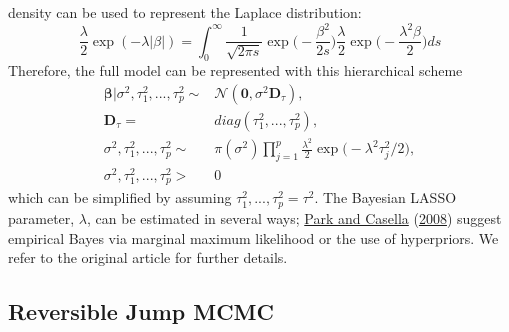 \documentclass[
  12pt,
]{book}
\theoremstyle{break}
\theoremstyle{nonumberplain}
\begin{document}
density can be used to represent the Laplace distribution: \[
\frac{\lambda}{2}\exp(-\lambda|\beta|)=\int_0^\infty \frac{1}{\sqrt{2\pi s}}\exp\bigg(-\frac{\beta^2}{2s}\bigg)\frac{\lambda}{2}\exp\bigg(-\frac{\lambda^2\beta}{2}\bigg)ds
\] Therefore, the full model can be represented with this hierarchical
scheme \begin{align*}
\boldsymbol{\beta}|\sigma^{2},\tau^{2}_{1},...,\tau^{2}_{p}\sim & \mathcal{N}(\boldsymbol{0},\sigma^{2}\boldsymbol{D}_{\tau}), \\
\boldsymbol{D}_{\tau}= & diag(\tau_{1}^{2},...,\tau_{p}^{2}),\\
\sigma^{2},\tau^{2}_{1},...,\tau^{2}_{p}\sim &  \pi(\sigma^{2})\prod_{j=1}^{p}\frac{\lambda^{2}}{2}\exp\bigg(-\lambda^{2}\tau^{2}_{j}/2\bigg),\\
\sigma^{2},\tau^{2}_{1},...,\tau^{2}_{p}> & 0
\end{align*} which can be simplified by assuming
\(\tau^{2}_{1},...,\tau^{2}_{p}=\tau^{2}\). The Bayesian LASSO
parameter, \(\lambda\), can be estimated in several ways;
\protect\hyperlink{ref-PC_2008}{Park and Casella}
(\protect\hyperlink{ref-PC_2008}{2008}) suggest empirical Bayes via
marginal maximum likelihood or the use of hyperpriors. We refer to the
original article for further details.

\subsection{Reversible Jump MCMC}
\end{document}
